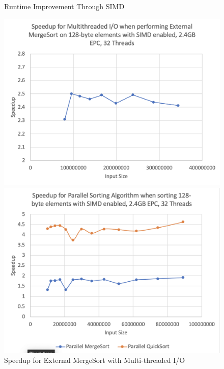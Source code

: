 \documentclass[final,hyperref={pdfpagelabels=false}]{beamer}
\begin{document}
\begin{frame}
\begin{columns}[t]
\begin{column}{.30\linewidth}
\begin{figure}[h]
\begin{minipage}{0.48\linewidth}
            \caption{Runtime Improvement Through SIMD}
        \end{minipage}
    \end{figure}

    \begin{figure}[h]
        \centering
        \begin{minipage}{0.48\linewidth}
            \includegraphics[width=\linewidth]{assets/sorting.png}
            \caption{Speedup for External MergeSort with Multi-threaded I/O}
        \end{minipage}
        \hfill
        \begin{minipage}{0.48\linewidth}
            \includegraphics[width=\linewidth]{assets/io.png}

\end{minipage}
\end{figure}
\end{column}
\end{columns}
\end{frame}
\end{document}
